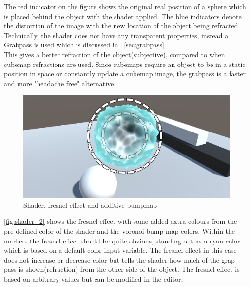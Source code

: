 \documentclass{article}
\newcommand{\secref}[1]{\nameref{#1}~\ref{#1}}
\begin{document}
The red indicator on the figure shows the original real position of a sphere which is placed behind the object with the shader applied. The blue indicators denote the distortion of the image with the new location of the object being refracted.\\Technically, the shader does not have any transparent properties, instead a Grabpass is used which is discussed in \secref{sec:grabpass}.\\

This gives a better refraction of the object(subjective), compared to when cubemap refractions are used. Since cubemaps require an object to be in a static position in space or constantly update a cubemap image, the grabpass is a faster and more "headache free" alternative.\\


\begin{figure}[H]
    \centering
    \includegraphics[width=\textwidth]{img/shader_2}
    \caption{Shader, fresnel effect and additive bumpmap}
    \label{fig:shader_2}
\end{figure}
\autoref{fig:shader_2} shows the fresnel effect with some added extra colours from the pre-defined color of the shader and the voronoi bump map colors. Within the markers the fresnel effect should be quite obvious, standing out as a cyan color which is based on a default color input variable. The fresnel effect in this case does not increase or decrease color but tells the shader how much of the grap-pass is shown(refraction) from the other side of the object. The fresnel effect is based on arbitrary values but can be modified in the editor. %
\end{document}

